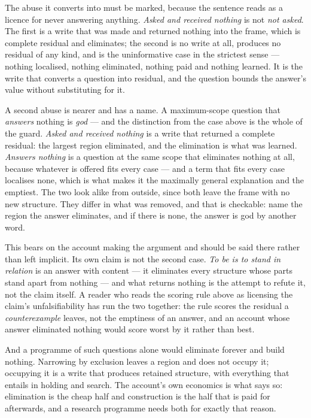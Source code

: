 \documentclass[11pt,a4paper]{article}
\theoremstyle{remark}\newtheorem{remark}[definition]{Remark}
\begin{document}
The abuse it converts into must be marked, because the sentence reads as a licence for never answering
anything. \emph{Asked and received nothing} is not \emph{not asked}. The first is a write that was made
and returned nothing into the frame, which is complete residual and eliminates; the second is no write
at all, produces no residual of any kind, and is the uninformative case in the strictest sense ---
nothing localised, nothing eliminated, nothing paid and nothing learned. It is the write that converts
a question into residual, and the question bounds the answer's value without substituting for it.

A second abuse is nearer and has a name. A maximum-scope question that \emph{answers} nothing is
\emph{god} --- and the distinction from the case above is the whole of the guard. \emph{Asked and
received nothing} is a write that returned a complete residual: the largest region eliminated, and the
elimination is what was learned. \emph{Answers nothing} is a question at the same scope that eliminates
nothing at all, because whatever is offered fits every case --- and a term that fits every case
localises none, which is what makes it the maximally general explanation and the emptiest. The two look
alike from outside, since both leave the frame with no new structure. They differ in what was removed,
and that is checkable: name the region the answer eliminates, and if there is none, the answer is
god by another word.

This bears on the account making the argument and should be said there rather than left implicit. Its
own claim is not the second case. \emph{To be is to stand in relation} is an answer with content ---
it eliminates every structure whose parts stand apart from nothing --- and what returns nothing is the
attempt to refute it, not the claim itself. A reader who reads the scoring rule above as licensing the
claim's unfalsifiability has run the two together: the rule scores the residual a \emph{counterexample}
leaves, not the emptiness of an answer, and an account whose answer eliminated nothing would score
worst by it rather than best.

And a programme of such questions alone would eliminate forever and build nothing. Narrowing by
exclusion leaves a region and does not occupy it; occupying it is a write that produces retained
structure, with everything that entails in holding and search. The account's own economics is what says
so: elimination is the cheap half and construction is the half that is paid for afterwards, and a
research programme needs both for exactly that reason.
\end{document}
